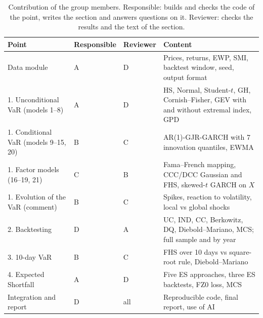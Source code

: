 \begin{table}[H]
\centering\small
\caption{Contribution of the group members. Responsible: builds and checks the code of the point, writes the section
and answers questions on it. Reviewer: checks the results and the text of the section.}
\begin{tabular}{p{4.4cm}p{1.9cm}p{1.6cm}p{6.3cm}}
\toprule
Point & Responsible & Reviewer & Content \\
\midrule
Data module & A & D & Prices, returns, EWP, SMI, backtest window, seed, output format \\
1. Unconditional VaR (models 1--8) & A & D & HS, Normal, Student-$t$, GH, Cornish--Fisher, GEV with and without extremal index, GPD \\
1. Conditional VaR (models 9--15, 20) & B & C & AR(1)-GJR-GARCH with 7 innovation quantiles, EWMA \\
1. Factor models (16--19, 21) & C & B & Fama--French mapping, CCC/DCC Gaussian and FHS, skewed-$t$ GARCH on $X$ \\
1. Evolution of the VaR (comment) & B & C & Spikes, reaction to volatility, local vs global shocks \\
2. Backtesting & D & A & UC, IND, CC, Berkowitz, DQ, Diebold--Mariano, MCS; full sample and by year \\
3. 10-day VaR & B & C & FHS over 10 days vs square-root rule, Diebold--Mariano \\
4. Expected Shortfall & A & D & Five ES approaches, three ES backtests, FZ0 loss, MCS \\
Integration and report & D & all & Reproducible code, final report, use of AI \\
\bottomrule
\end{tabular}
\end{table}

